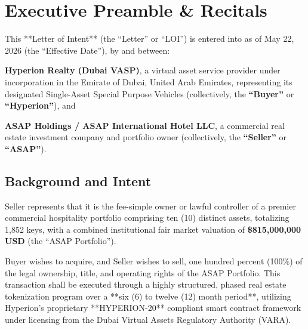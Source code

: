 \documentclass[11pt,a4paper]{article}
\begin{document}

\newpage
\thispagestyle{plain}
\par\vspace{15pt}
\makeatletter
{}
\makeatother
\clearpage

\section{Executive Preamble \& Recitals}
This **Letter of Intent** (the ``Letter'' or ``LOI'') is entered into as of May 22, 2026 (the ``Effective Date''), by and between:
\par\vspace{5pt}
\noindent
\textbf{Hyperion Realty (Dubai VASP)}, a virtual asset service provider under incorporation in the Emirate of Dubai, United Arab Emirates, representing its designated Single-Asset Special Purpose Vehicles (collectively, the \textbf{``Buyer''} or \textbf{``Hyperion''}), and
\par\vspace{5pt}
\noindent
\textbf{ASAP Holdings / ASAP International Hotel LLC}, a commercial real estate investment company and portfolio owner (collectively, the \textbf{``Seller''} or \textbf{``ASAP''}).

\subsection{Background and Intent}
Seller represents that it is the fee-simple owner or lawful controller of a premier commercial hospitality portfolio comprising ten (10) distinct assets, totalizing 1,852 keys, with a combined institutional fair market valuation of \textbf{\$815,000,000 USD} (the ``ASAP Portfolio''). 

Buyer wishes to acquire, and Seller wishes to sell, one hundred percent (100\%) of the legal ownership, title, and operating rights of the ASAP Portfolio. This transaction shall be executed through a highly structured, phased real estate tokenization program over a **six (6) to twelve (12) month period**, utilizing Hyperion's proprietary **HYPERION-20** compliant smart contract framework under licensing from the Dubai Virtual Assets Regulatory Authority (VARA).
\end{document}
